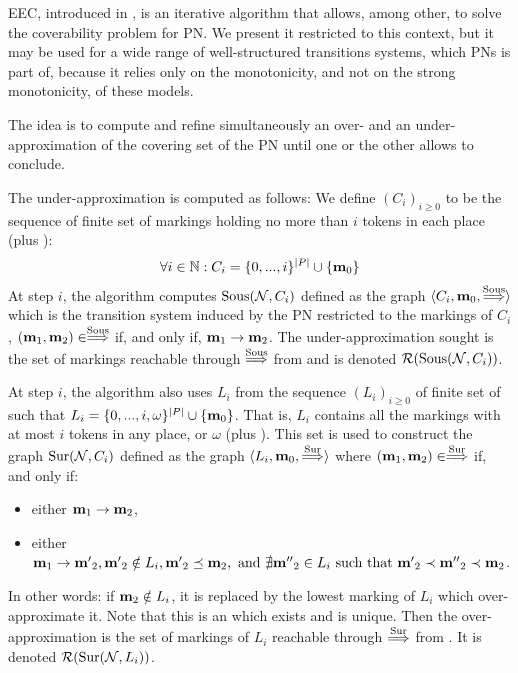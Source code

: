\ac{EEC}, introduced in \cite{Geeraerts07thesis, Geeraerts06}, is an iterative algorithm that allows, among other, to solve the coverability problem for \ac{PN}.
We present it restricted to this context, but it may be used for a wide range of well-structured transitions systems, which \acp{PN} is part of, because it relies only on the monotonicity, and not on the strong monotonicity, of these models.

The idea is to compute and refine simultaneously an over- and an under-approximation of the covering set of the \ac{PN} until one or the other allows to conclude.

The under-approximation is computed as follows:
We define $(C_i)_{i \geq 0}$ to be the sequence of finite set of markings holding no more than $i$ tokens in each place (plus \mari):
\[
  \forall i \in \mathbb{N} : C_i = \{0, ..., i\}^{|P|} \cup \{\mathbf{m}_0\}
\]
At step $i$, the algorithm computes $\operatorname{Sous}(\mathcal{N}, C_i)$ defined as the graph $\langle C_i, \mathbf{m}_0, \stackrel{\operatorname{Sous}}{\Longrightarrow} \rangle$ which is the transition system induced by the \ac{PN} \N restricted to the markings of $C_i$,  $(\mathbf{m}_1, \mathbf{m}_2) \in \stackrel{\operatorname{Sous}}{\Longrightarrow}$ if, and only if, $\mathbf{m}_1 \rightarrow \mathbf{m}_2$.
The under-approximation sought is the set of markings reachable through $\stackrel{\operatorname{Sous}}{\Longrightarrow}$ from \mari and is denoted $\operatorname{\mathcal{R}}(\operatorname{Sous}(\mathcal{N}, C_i))$.

At step $i$, the algorithm also uses $L_i$ from the sequence $(L_i)_{i \geq 0}$ of finite set of \omarks such that $L_i = \{0, ..., i, \omega \}^{|P|} \cup \{\mathbf{m}_0\}$.
That is, $L_i$ contains all the markings with at most $i$ tokens in any place, or $\omega$ (plus \mari).
This set is used to construct the graph $\operatorname{Sur}(\mathcal{N}, C_i)$ defined as the graph $\langle L_i, \mathbf{m}_0, \stackrel{\operatorname{Sur}}{\Longrightarrow} \rangle$ where $(\mathbf{m}_1, \mathbf{m}_2) \in \stackrel{\operatorname{Sur}}{\Longrightarrow}$ if, and only if:
\begin{itemize}
  \item either $\mathbf{m}_1 \rightarrow \mathbf{m}_2$,
  \item either $\mathbf{m}_1 \rightarrow \mathbf{m'}_2, \mathbf{m'}_2 \notin L_i, \mathbf{m'}_2 \preceq \mathbf{m}_2, \text{ and } \nexists \mathbf{m''}_2 \in L_i \text{ such that } \mathbf{m'}_2 \prec \mathbf{m''}_2 \prec \mathbf{m}_2$.
\end{itemize}
In other words: if $\mathbf{m}_2 \notin L_i$, it is replaced by the lowest marking of $L_i$ which over-approximate it.
Note that this is an \omark which exists and is unique. 
Then the over-approximation is the set of markings of $L_i$ reachable through $\stackrel{\operatorname{Sur}}{\Longrightarrow}$ from \mari. It is denoted $\operatorname{\mathcal{R}}(\operatorname{Sur}(\mathcal{N}, L_i))$.

